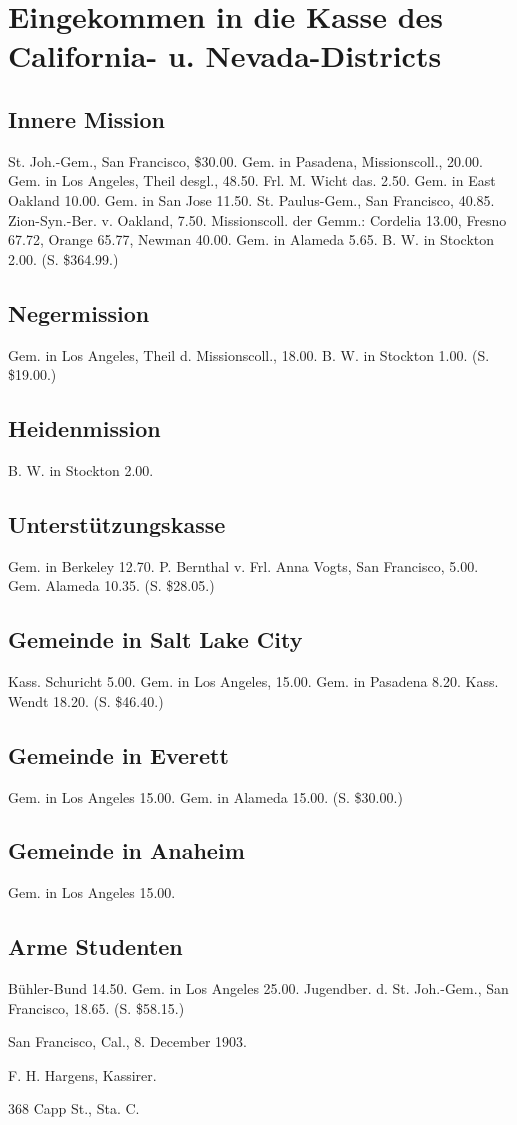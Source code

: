 \chapter[California- u. Nevada-Districts]{Eingekommen in die Kasse des California- u. Nevada-Districts}

\section{Innere Mission}
St. Joh.-Gem., San Francisco, \$30.00. Gem. in Pasadena, Missionscoll., 20.00. Gem. in Los Angeles, Theil desgl., 48.50. Frl. M. Wicht das. 2.50. Gem. in East Oakland 10.00. Gem. in San Jose 11.50. St. Paulus-Gem., San Francisco, 40.85. Zion-Syn.-Ber. v. Oakland, 7.50. Missionscoll. der Gemm.: Cordelia 13.00, Fresno 67.72, Orange 65.77, Newman 40.00. Gem. in Alameda 5.65. B. W. in Stockton 2.00. (S. \$364.99.)

\section{Negermission}
Gem. in Los Angeles, Theil d. Missionscoll., 18.00. B. W. in Stockton 1.00. (S. \$19.00.)

\section{Heidenmission}
B. W. in Stockton 2.00.

\section{Unterstützungskasse}
Gem. in Berkeley 12.70. P. Bernthal v. Frl. Anna Vogts, San Francisco, 5.00. Gem. Alameda 10.35. (S. \$28.05.)

\section{Gemeinde in Salt Lake City}
Kass. Schuricht 5.00. Gem. in Los Angeles, 15.00. Gem. in Pasadena 8.20. Kass. Wendt 18.20. (S. \$46.40.)

\section{Gemeinde in Everett}
Gem. in Los Angeles 15.00. Gem. in Alameda 15.00. (S. \$30.00.)

\section{Gemeinde in Anaheim}
Gem. in Los Angeles 15.00.

\section{Arme Studenten}
Bühler-Bund 14.50. Gem. in Los Angeles 25.00. Jugendber. d. St. Joh.-Gem., San Francisco, 18.65. (S. \$58.15.)

San Francisco, Cal., 8. December 1903.

F. H. Hargens, Kassirer.

368 Capp St., Sta. C.
